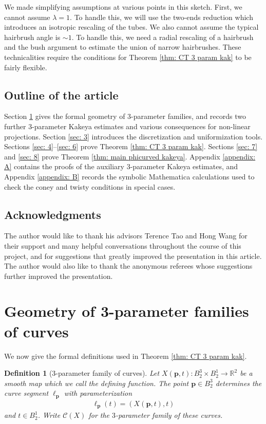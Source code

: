 \documentclass[12pt]{amsart}
\numberwithin{equation}{section}
\newtheorem{definition}[lemma]{Definition}
\newcommand{\R}{\mathbb{R}}
\newcommand{\1}{\mathbbm{1}}
\newcommand{\p}{\mathbf p}
\begin{document}
We made simplifying assumptions at various points in this sketch. First, we cannot assume $\lambda = 1$. To handle this, we will use the two-ends reduction which introduces an isotropic rescaling of the tubes. We also cannot assume the typical hairbrush angle is $\sim 1$. To handle this, we need a radial rescaling of a hairbrush and the bush argument to estimate the union of narrow hairbrushes. These technicalities require the conditions for Theorem \ref{thm: CT 3 param kak} to be fairly flexible. 


\subsection{Outline of the article}
Section \ref{sec: 2} gives the formal geometry of 3-parameter families, and records two further 3-parameter Kakeya estimates and various consequences for non-linear projections. Section \ref{sec: 3} introduces the discretization and uniformization tools. Sections \ref{sec: 4}--\ref{sec: 6} prove Theorem \ref{thm: CT 3 param kak}. Sections \ref{sec: 7} and \ref{sec: 8} prove Theorem \ref{thm: main phicurved kakeya}. Appendix \ref{appendix: A} contains the proofs of the auxiliary 3-parameter Kakeya estimates, and Appendix \ref{appendix: B} records the symbolic Mathematica calculations used to check the coney and twisty conditions in special cases. 



\subsection{Acknowledgments}

The author would like to thank his advisors Terence Tao and Hong Wang for their support and many helpful conversations throughout the course of this project, and for suggestions that greatly improved the presentation in this article. The author would also like to thank the anonymous referees whose suggestions further improved the presentation. 





\section{Geometry of 3-parameter families of curves}\label{sec: 2}

We now give the formal definitions used in Theorem \ref{thm: CT 3 param kak}. 

\begin{definition}[3-parameter family of curves]\label{def: 3 param family}
    Let $X(\p,t) : B_2^3 \times B_2^1 \to \R^2$ be a smooth map which we call the \emph{defining function}. The point $\p \in B_2^3$ determines the curve segment $\ell_\p$ with parameterization 
    \begin{align}
        \ell_\p(t) = (X(\p,t),t) 
    \end{align}
    and $t \in B_2^1$. 
    Write $\mathcal C(X)$ for the $3$-parameter family of these curves.
\end{definition}
\end{document}
